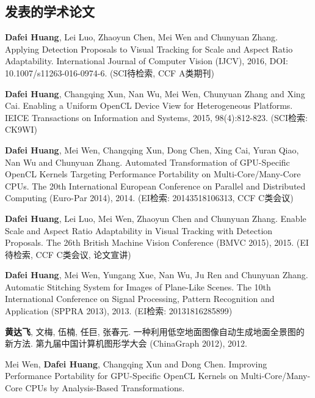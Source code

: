 \begin{resume}

  \section*{发表的学术论文} %

  \begin{enumerate}[{[}1{]}]
  \addtolength{\itemsep}{-.36\baselineskip}%
  \item \textbf{Dafei Huang}, Lei Luo, Zhaoyun Chen, Mei Wen and Chunyuan Zhang. 
  Applying Detection Proposals to Visual Tracking for Scale and Aspect Ratio Adaptability. 
  International Journal of Computer Vision (IJCV), 2016, DOI: 10.1007/s11263-016-0974-6.
  (SCI待检索, CCF A类期刊)
  \item \textbf{Dafei Huang}, Changqing Xun, Nan Wu, Mei Wen, Chunyuan Zhang and Xing Cai.
  Enabling a Uniform OpenCL Device View for Heterogeneous Platforms.
  IEICE Transactions on Information and Systems, 2015, 98(4):812-823.
  (SCI检索: CK9WI)
  \item \textbf{Dafei Huang}, Mei Wen, Changqing Xun, Dong Chen, Xing Cai, Yuran Qiao, Nan Wu and Chunyuan Zhang.
  Automated Transformation of GPU-Specific OpenCL Kernels Targeting Performance Portability on Multi-Core/Many-Core CPUs.
  The 20th International European Conference on Parallel and Distributed Computing (Euro-Par 2014), 2014.
  (EI检索: 20143518106313, CCF C类会议)
  \item \textbf{Dafei Huang}, Lei Luo, Mei Wen, Zhaoyun Chen and Chunyuan Zhang.
  Enable Scale and Aspect Ratio Adaptability in Visual Tracking with Detection Proposals.
  The 26th British Machine Vision Conference (BMVC 2015), 2015.
  (EI待检索, CCF C类会议, 论文宣讲)
  \item \textbf{Dafei Huang}, Mei Wen, Yungang Xue, Nan Wu, Ju Ren and Chunyuan Zhang.
  Automatic Stitching System for Images of Plane-Like Scenes.
  The 10th International Conference on Signal Processing, Pattern Recognition and Application (SPPRA 2013), 2013.
  (EI检索: 20131816285899)
  \item \textbf{黄达飞}, 文梅, 伍楠, 任巨, 张春元. 
  一种利用低空地面图像自动生成地面全景图的新方法. 
  第九届中国计算机图形学大会 (ChinaGraph 2012), 2012.
  \item Mei Wen, \textbf{Dafei Huang}, Changqing Xun and Dong Chen.
  Improving Performance Portability for GPU-Specific OpenCL Kernels on Multi-Core/Many-Core CPUs by Analysis-Based
  Transformations.

\end{enumerate}
\end{resume}

